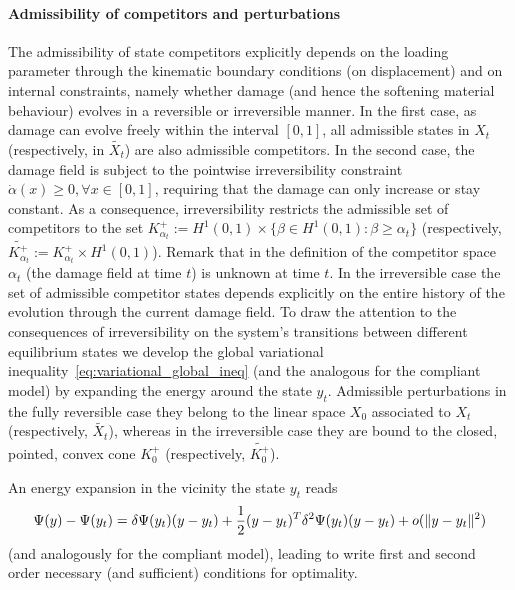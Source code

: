 \paragraph{Admissibility of competitors and perturbations}
The admissibility of state competitors explicitly depends on the loading parameter through the kinematic boundary conditions (on displacement) and on internal constraints, namely whether damage (and hence the softening material behaviour)  evolves in a reversible or irreversible manner.
In the first case, as damage can evolve freely within the interval $[0, 1]$, all admissible states in $X_t$  (respectively, in $\widetilde{X_t}$) are also admissible competitors. 
In the second case, the damage field is subject to the pointwise irreversibility constraint $\dot \alpha(x)\geq 0, \forall x\in [0, 1]$, requiring that the damage can only increase or stay constant. 
As a consequence, irreversibility restricts the admissible set of competitors to the set $K^+_{\alpha_t}:=H^1(0, 1) \times \{\beta\in H^1(0, 1): \beta\geq \alpha_t\}$ (respectively, $\widetilde{K^+_{\alpha_t}}:=K^+_{\alpha_t}\times H^1(0, 1)$). 
Remark that in the definition of the competitor space $\alpha_t$ (the damage field at time $t$) is unknown at time $t$. 
In the irreversible case the set of admissible competitor states depends explicitly on the entire history of the evolution through the current damage field.
To draw the attention to the consequences of irreversibility on the system's transitions between different equilibrium states we develop the global variational inequality~\eqref{eq:variational_global_ineq} (and the analogous for the compliant model) by expanding the energy around the state $y_t$. 
Admissible perturbations in the fully reversible case they belong to the linear space $X_0$ associated to $X_t$ (respectively, $\widetilde{X_t}$), whereas in the irreversible case they are bound to the closed, pointed, convex cone $K^+_0$ (respectively, $\widetilde{K^+_0}$).

An energy expansion in the vicinity the state $y_t$ reads
$$
\Psi(y)-\Psi(y_t)= \delta\Psi(y_t)(y-y_t)+\frac{1}{2}(y-y_t)^T \delta^2\Psi(y_t)(y-y_t)+o(\|y-y_t\|^2)
    \label{eqn:energy-expansion}
$$
(and analogously for the compliant model), leading to write first and second order necessary (and sufficient) conditions for optimality.


